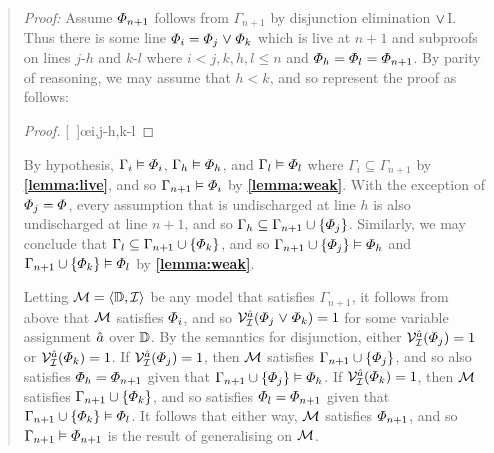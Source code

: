 \label{rule:DisE}

\begin{quote} 
  \textit{Proof:} Assume $\varPhi_{n+1}$ follows from $\Gamma_{n+1}$ by disjunction elimination $\mkern1mu\vee\mkern1mu$I.
  Thus there is some line $\varPhi_i=\varPhi_j\mkern1mu\vee\mkern1mu\varPhi_k$ which is live at $n+1$ and subproofs on lines $j$-$h$ and $k$-$l$ where $i<j,k,h,l\leq n$ and $\varPhi_h=\varPhi_l=\varPhi_{n+1}$.
  By parity of reasoning, we may assume that $h<k$, and so represent the proof as follows:

  \begin{proof}
  \open
     
  \close
  \open
     
  \close
  [\ ]{\metaC}\oe{i,j-h,k-l} 
  \end{proof}

  By hypothesis, $\Gamma_i\vDash \varPhi_i$, $\Gamma_h\vDash \varPhi_h$, and $\Gamma_l\vDash \varPhi_l$ where $\Gamma_i\subseteq \Gamma_{n+1}$ by \textbf{\ref{lemma:live}}, and so $\Gamma_{n+1} \vDash \varPhi_i$ by \textbf{\ref{lemma:weak}}.
  With the exception of $\varPhi_j=\varPhi$, every assumption that is undischarged at line $h$ is also undischarged at line $n+1$, and so $\Gamma_h\subseteq\Gamma_{n+1}\cup\lbrace\varPhi_j\rbrace$.
  Similarly, we may conclude that $\Gamma_l\subseteq\Gamma_{n+1}\cup\lbrace\varPhi_k\rbrace$, and so $\Gamma_{n+1}\cup\lbrace\varPhi_j\rbrace \vDash \varPhi_h$ and $\Gamma_{n+1}\cup\lbrace\varPhi_k\rbrace \vDash \varPhi_l$ by \textbf{\ref{lemma:weak}}.

  Letting $\mathcal{M}=\langle\mathbb{D},\mathcal{I}\rangle$ be any model that satisfies $\Gamma_{n+1}$, it follows from above that $\mathcal{M}$ satisfies $\varPhi_i$, and so $\mathcal{V}_{\mathcal{I}}^{\hat{a}}(\varPhi_j\mkern1mu\vee\mkern1mu\varPhi_k)=1$ for some variable assignment $\hat{a}$ over $\mathbb{D}$.
  By the semantics for disjunction, either $\mathcal{V}_{\mathcal{I}}^{\hat{a}}(\varPhi_j)=1$ or $\mathcal{V}_{\mathcal{I}}^{\hat{a}}(\varPhi_k)=1$.
  If $\mathcal{V}_{\mathcal{I}}^{\hat{a}}(\varPhi_j)=1$, then $\mathcal{M}$ satisfies $\Gamma_{n+1}\cup\lbrace\varPhi_j\rbrace$, and so also satisfies $\varPhi_h=\varPhi_{n+1}$ given that $\Gamma_{n+1}\cup\lbrace\varPhi_j\rbrace \vDash \varPhi_h$. 
  If $\mathcal{V}_{\mathcal{I}}^{\hat{a}}(\varPhi_k)=1$, then $\mathcal{M}$ satisfies $\Gamma_{n+1}\cup\lbrace\varPhi_k\rbrace$, and so satisfies $\varPhi_l=\varPhi_{n+1}$ given that$\Gamma_{n+1}\cup\lbrace\varPhi_k\rbrace \vDash \varPhi_l$.
  It follows that either way, $\mathcal{M}$ satisfies $\varPhi_{n+1}$, and so $\Gamma_{n+1} \vDash \varPhi_{n+1}$ is the result of generalising on $\mathcal{M}$.
\end{quote}






